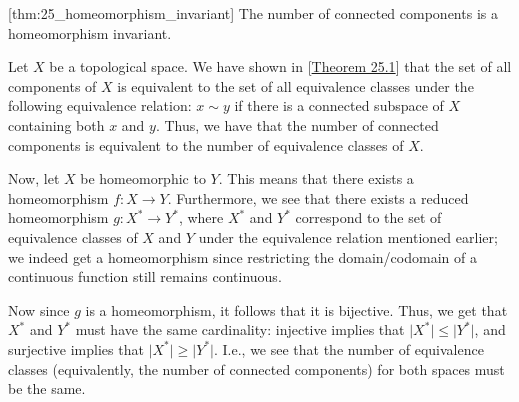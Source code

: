 \begin{thmBox}{}[thm:25_homeomorphism_invariant]
    The number of connected components is a homeomorphism invariant.

    \baseRule

    \begin{proofBox}
        Let \( X \) be a topological space.
        We have shown in [\hyperlink{thm:25.1}{Theorem 25.1}] that the set of 
        all components of \( X \) is equivalent to the set of all equivalence 
        classes under the following equivalence relation: \( x \sim y \) if
        there is a connected subspace of \( X \) containing both \( x \) and
        \( y \).
        Thus, we have that the number of connected components is equivalent to
        the number of equivalence classes of \( X \).
        
        \baseSkip

        Now, let \( X \) be homeomorphic to \( Y \).
        This means that there exists a homeomorphism \( f: X \rightarrow Y \).
        Furthermore, we see that there exists a reduced homeomorphism 
        \( g: X^{ * } \rightarrow Y^{ * } \), where \( X^{ * } \) and 
        \( Y^{ * } \) correspond to the set of equivalence classes of \( X \) 
        and \( Y \) under the equivalence relation mentioned earlier;
        we indeed get a homeomorphism since restricting the domain/codomain
        of a continuous function still remains continuous.

        \baseSkip

        Now since \( g \) is a homeomorphism, it follows that it is bijective.
        Thus, we get that \( X^{ * } \) and \( Y^{ * } \) must have the 
        same cardinality: injective implies that \( \lvert X^{ * } \rvert \leq 
        \lvert Y^{ * } \rvert \), and surjective implies that 
        \( \lvert X^{ * } \rvert \geq \lvert Y^{ * } \rvert \).
        I.e., we see that the number of equivalence classes (equivalently, 
        the number of connected components) for both spaces must be the same.
    \end{proofBox}
\end{thmBox}
